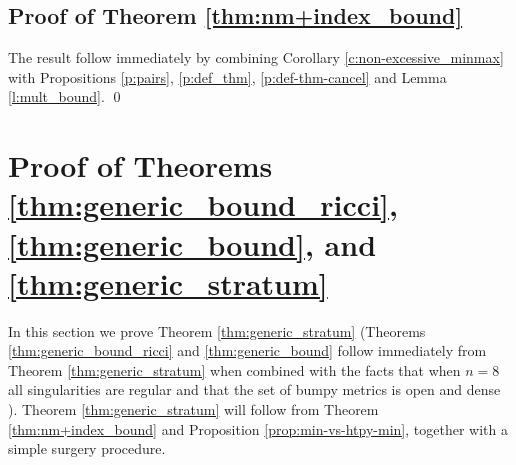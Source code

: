 \documentclass[12pt,twoside]{amsart}
\numberwithin{equation}{section}
\begin{document}
	
	
	
	
	\subsection{Proof of Theorem \ref{thm:nm+index_bound}} The result follow immediately by combining Corollary \ref{c:non-excessive_minmax} with Propositions \ref{p:pairs}, \ref{p:def_thm}, \ref{p:def-thm-cancel} and Lemma \ref{l:mult_bound}. \qed
		
	\section{Proof of Theorems \ref{thm:generic_bound_ricci},  \ref{thm:generic_bound}, and \ref{thm:generic_stratum}}
    In this section we prove Theorem \ref{thm:generic_stratum} (Theorems \ref{thm:generic_bound_ricci} and \ref{thm:generic_bound} follow immediately from Theorem \ref{thm:generic_stratum} when combined with the facts that when $n=8$ all singularities are regular and that the set of bumpy metrics is open and dense \cite{White:bumpy,White:bumpy2}). Theorem \ref{thm:generic_stratum} will follow from Theorem \ref{thm:nm+index_bound} and Proposition \ref{prop:min-vs-htpy-min}, together with a simple surgery procedure.
    
    
\end{document}
